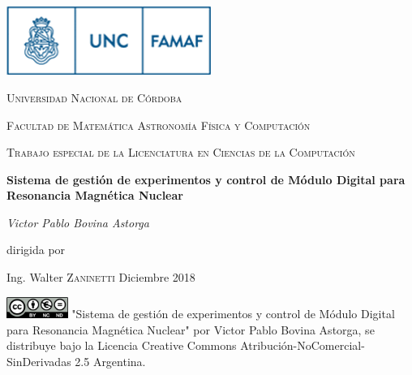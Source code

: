 

\begin{titlepage}
	\centering
	\includegraphics[width=0.50\textwidth]{../figures/famaf-logo.png}\par\vspace{1cm}
    {\scshape\LARGE Universidad Nacional de C\'ordoba \par}
    {\scshape\LARGE Facultad de Matem\'atica Astronom\'ia F\'isica y Computaci\'on \par}
	\vspace{1cm}
	{\scshape\Large Trabajo especial de la Licenciatura en
    Ciencias de la Computaci\'on\par}
	\vspace{1.5cm}
	{\huge \textbf{Sistema de gesti\'on de experimentos y control de M\'odulo Digital para Resonancia Magn\'etica Nuclear}\par}
	\vspace{2cm}
	{\Large\itshape Victor Pablo Bovina Astorga\par}
	\vfill
    dirigida por \par 
    Ing. Walter \textsc{Zaninetti}
    \vfill
    Diciembre 2018
    \vfill

\includegraphics[width=0.15\textwidth]{../figures/cc.png}
\vfill
{\tiny "Sistema de gesti\'on de experimentos y control de M\'odulo Digital para Resonancia Magn\'etica Nuclear" por Victor Pablo Bovina Astorga, se distribuye bajo la Licencia Creative Commons
Atribución-NoComercial-SinDerivadas 2.5 Argentina.}
\end{titlepage}